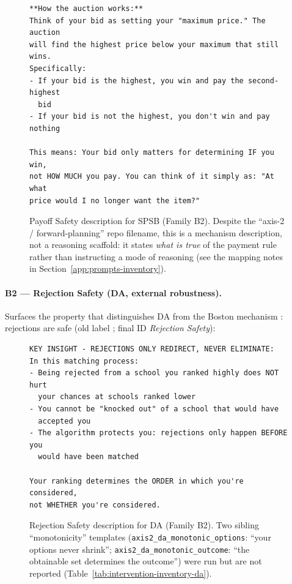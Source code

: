 \begin{figure}[H]
\begin{lstlisting}
**How the auction works:**
Think of your bid as setting your "maximum price." The auction
will find the highest price below your maximum that still wins.
Specifically:
- If your bid is the highest, you win and pay the second-highest
  bid
- If your bid is not the highest, you don't win and pay nothing

This means: Your bid only matters for determining IF you win,
not HOW MUCH you pay. You can think of it simply as: "At what
price would I no longer want the item?"
\end{lstlisting}
\caption{Payoff Safety description for SPSB (Family B2). Despite the ``axis-2 / forward-planning'' repo filename, this is a mechanism description, not a reasoning scaffold: it states \emph{what is true} of the payment rule rather than instructing a mode of reasoning (see the mapping notes in Section~\ref{app:prompts-inventory}).}
\label{fig:prompt-payoff-safety}
\end{figure}

\paragraph{B2 --- Rejection Safety (DA, external robustness).} Surfaces the property that distinguishes DA from the Boston mechanism \citep{abdulkadirouglu2003school}: rejections are safe (old label ; final ID \emph{Rejection Safety}):

\begin{figure}[H]
\begin{lstlisting}
KEY INSIGHT - REJECTIONS ONLY REDIRECT, NEVER ELIMINATE:
In this matching process:
- Being rejected from a school you ranked highly does NOT hurt
  your chances at schools ranked lower
- You cannot be "knocked out" of a school that would have
  accepted you
- The algorithm protects you: rejections only happen BEFORE you
  would have been matched

Your ranking determines the ORDER in which you're considered,
not WHETHER you're considered.
\end{lstlisting}
\caption{Rejection Safety description for DA (Family B2). Two sibling ``monotonicity'' templates (\texttt{axis2\_da\_monotonic\_options}: ``your options never shrink''; \texttt{axis2\_da\_monotonic\_outcome}: ``the obtainable set determines the outcome'') were run but are not reported (Table~\ref{tab:intervention-inventory-da}).}
\label{fig:prompt-rejection-safety}
\end{figure}

